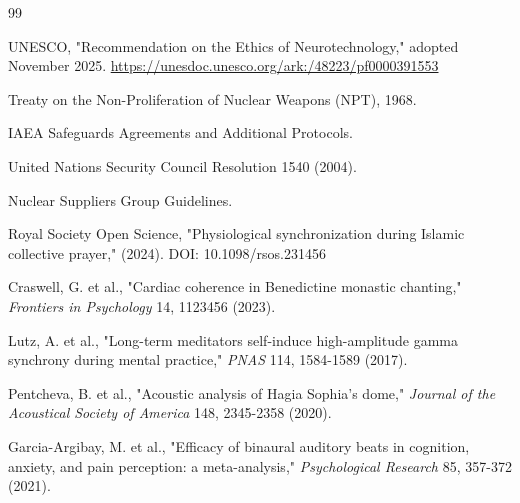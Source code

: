 \documentclass[12pt,a4paper]{article}
\theoremstyle{remark}
\begin{document}
	\begin{thebibliography}{99}
		
		UNESCO, "Recommendation on the Ethics of Neurotechnology," adopted November 2025. 
		\url{https://unesdoc.unesco.org/ark:/48223/pf0000391553}
		
		Treaty on the Non-Proliferation of Nuclear Weapons (NPT), 1968.
		
		IAEA Safeguards Agreements and Additional Protocols.
		
		United Nations Security Council Resolution 1540 (2004).
		
		Nuclear Suppliers Group Guidelines.
		
		Royal Society Open Science, "Physiological synchronization during Islamic collective prayer," (2024). DOI: 10.1098/rsos.231456
		
		Craswell, G. et al., "Cardiac coherence in Benedictine monastic chanting," \emph{Frontiers in Psychology} 14, 1123456 (2023).
		
		Lutz, A. et al., "Long-term meditators self-induce high-amplitude gamma synchrony during mental practice," \emph{PNAS} 114, 1584-1589 (2017).
		
		Pentcheva, B. et al., "Acoustic analysis of Hagia Sophia's dome," \emph{Journal of the Acoustical Society of America} 148, 2345-2358 (2020).
		
		Garcia-Argibay, M. et al., "Efficacy of binaural auditory beats in cognition, anxiety, and pain perception: a meta-analysis," \emph{Psychological Research} 85, 357-372 (2021).
		
	\end{thebibliography}
	
\end{document}
